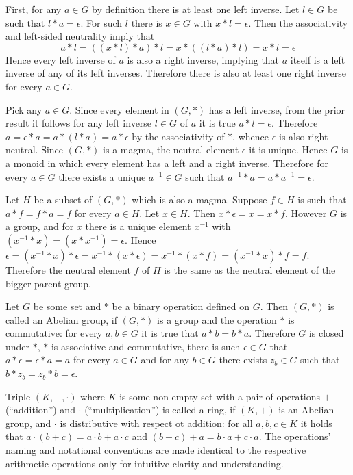 \documentclass[a4paper]{article}
\newcommand{\brac}[1]{{\left({#1}\right)}}
\begin{document}
First, for any $a\in G$ by definition there is at least one left inverse. Let $l\in G$ be such that $l\ast a=\epsilon$. For such $l$ there is $x\in G$ with $x\ast l=\epsilon$. Then the associativity and left-sided neutrality imply that \[a\ast l = \brac{\brac{x\ast l}\ast a}\ast l = x\ast \brac{\brac{l\ast a}\ast l} = x\ast l = \epsilon\] Hence every left inverse of $a$ is also a right inverse, implying that $a$ itself is a left inverse of any of its left inverses. Therefore there is also at least one right inverse for every $a\in G$.

Pick any $a\in G$. Since every element in $\brac{G, \ast}$ has a left inverse, from the prior result it follows for any left inverse $l\in G$ of $a$ it is true $a\ast l = \epsilon$. Therefore $a = \epsilon\ast a = a\ast \brac{l\ast a} = a\ast \epsilon$ by the associativity of $\ast$, whence $\epsilon$ is also right neutral. Since $\brac{G, \ast}$ is a magma, the neutral element $\epsilon$ it is unique. Hence $G$ is a monoid in which every element has a left and a right inverse. Therefore for every $a\in G$ there exists a unique $a^{-1}\in G$ such that $a^{-1}\ast a = a\ast a^{-1} = \epsilon$.

Let $H$ be a subset of $\brac{G,\ast}$ which is also a magma. Suppose $f\in H$ is such that $a\ast f=f\ast a = f$ for every $a\in H$. Let $x\in H$. Then $x\ast \epsilon = x = x\ast f$. However $G$ is a group, and for $x$ there is a unique element $x^{-1}$ with $\brac{x^{-1}\ast x}=\brac{x\ast x^{-1}} = \epsilon$. Hence $\epsilon = \brac{x^{-1}\ast x}\ast \epsilon = x^{-1}\ast \brac{x\ast \epsilon} = x^{-1}\ast \brac{x\ast f} = \brac{x^{-1}\ast x}\ast f = f$. Therefore the neutral element $f$ of $H$ is the same as the neutral element of the bigger parent group.

Let $G$ be some set and $\ast$ be a binary operation defined on $G$. Then $\brac{G, \ast}$ is called an Abelian group, if $\brac{G, \ast}$ is a group and the operation $\ast$ is commutative: for every $a, b\in G$ it is true that $a\ast b = b\ast a$. Therefore $G$ is closed under $\ast$, $\ast$ is associative and commutative, there is such $\epsilon \in G$ that $a\ast \epsilon = \epsilon\ast a = a$ for every $a \in G$ and for any $b \in G$ there exists $z_b \in G$ such that $b\ast z_b = z_b\ast b = \epsilon$.

Triple $\brac{K, +, \cdot}$ where $K$ is some non-empty set with a pair of operations $+$ (``addition'') and $\cdot$ (``multiplication'') is called a ring, if $\brac{K, +}$ is an Abelian group, and $\cdot$ is distributive with respect ot addition: for all $a,b,c \in K$ it holds that $a\cdot \brac{b+c}=a\cdot b + a\cdot c$ and $\brac{b+c}+ a=b\cdot a + c\cdot a$. The operations' naming and notational conventions are made identical to the respective arithmetic operations only for intuitive clarity and understanding.
\end{document}
